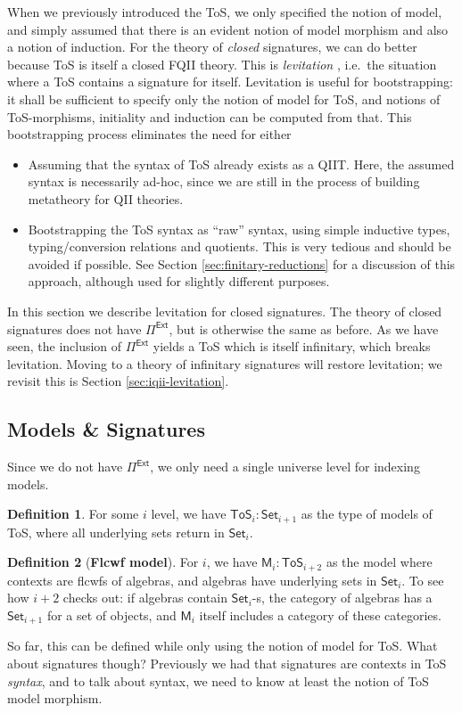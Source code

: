 \documentclass[12pt,a4paper,twoside,openany]{book}
\theoremstyle{remark}
\theoremstyle{definition}
\newtheorem{mydefinition}{Definition}
\theoremstyle{theorem}
\newcommand{\bs}[1]{\boldsymbol{#1}}
\newcommand{\Set}{\mathsf{Set}}
\newcommand{\ToS}{\mathsf{ToS}}
\newcommand{\Pie}{\Pi^{\mathsf{Ext}}}
\newcommand{\bM}{\bs{\mathsf{M}}}
\begin{document}
When we previously introduced the ToS, we only specified the notion of model,
and simply assumed that there is an evident notion of model morphism and also a
notion of induction. For the theory of \emph{closed} signatures, we can do
better because ToS is itself a closed FQII theory. This is
\emph{levitation} \cite{chapman2010gentle}, i.e.\ the situation where a ToS contains a
signature for itself. Levitation is useful for bootstrapping: it shall be
sufficient to specify only the notion of model for ToS, and notions of
ToS-morphisms, initiality and induction can be computed from that. This
bootstrapping process eliminates the need for either
\begin{itemize}
  \item Assuming that the syntax of ToS already exists as a QIIT. Here, the assumed
        syntax is necessarily ad-hoc, since we are still in the process
        of building metatheory for QII theories.
  \item Bootstrapping the ToS syntax as ``raw'' syntax, using simple inductive
        types, typing/conversion relations and quotients. This is very tedious and
        should be avoided if possible. See Section \ref{sec:finitary-reductions} for
        a discussion of this approach, although used for slightly different
        purposes.
\end{itemize}

In this section we describe levitation for closed signatures. The theory of
closed signatures does not have $\Pie$, but is otherwise the same as before.  As
we have seen, the inclusion of $\Pie$ yields a ToS which is itself infinitary,
which breaks levitation. Moving to a theory of infinitary signatures will
restore levitation; we revisit this is Section \ref{sec:iqii-levitation}.

\subsection{Models \& Signatures}

Since we do not have $\Pie$, we only need a single universe level for indexing models.

\begin{mydefinition} For some $i$ level, we have $\ToS_i : \Set_{i+1}$ as the type of
models of ToS, where all underlying sets return in $\Set_i$.
\end{mydefinition}

\begin{mydefinition}[\textbf{Flcwf model}]
For $i$, we have $\bM_{i} : \ToS_{i + 2}$ as the model where contexts are flcwfs
of algebras, and algebras have underlying sets in $\Set_i$. To see how $i + 2$
checks out: if algebras contain $\Set_i$-s, the category of algebras has a
$\Set_{i + 1}$ for a set of objects, and $\bM_{i}$ itself includes a category of
these categories.
\end{mydefinition}
So far, this can be defined while only using the notion of model for ToS. What
about signatures though? Previously we had that signatures are contexts in ToS
\emph{syntax}, and to talk about syntax, we need to know at least the notion of
ToS model morphism.
\end{document}
